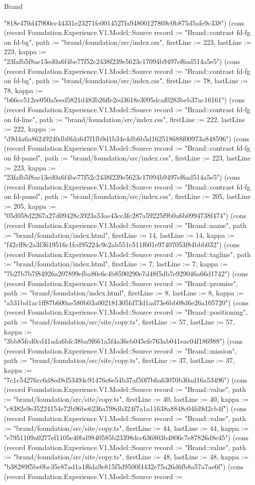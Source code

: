 \begin{lexlean}{Brand}
\begin{semanticmodule}
{"818e470d47900cc44331e23271fe0014527fa94800127869c0b875d5afe9c338"}) (cons (record Foundation.Experience.V1.Model::Source {record := "Brand::contrast fd-fg on fd-bg", path := "brand/foundation/src/index.css", firstLine := 223, lastLine := 223, kappa := "23fafb5f8ae13ed0a6f4be77f52c2438f239e5623c17094b9497ef6ad514a5e5"}) (cons (record Foundation.Experience.V1.Model::Source {record := "Brand::contrast fd-fg on fd-bg", path := "brand/foundation/src/index.css", firstLine := 78, lastLine := 78, kappa := "b66cc512ee050a5eed5821d483b26ffe2ed3618e3095dcaf0283beb37ac16161"}) (cons (record Foundation.Experience.V1.Model::Source {record := "Brand::contrast fd-fg on fd-line", path := "brand/foundation/src/index.css", firstLine := 222, lastLine := 222, kappa := "d9d4a6a86249240db0fda647f1fb9d1b34e4db6b5d162518688f00973a848596"}) (cons (record Foundation.Experience.V1.Model::Source {record := "Brand::contrast fd-fg on fd-panel", path := "brand/foundation/src/index.css", firstLine := 223, lastLine := 223, kappa := "23fafb5f8ae13ed0a6f4be77f52c2438f239e5623c17094b9497ef6ad514a5e5"}) (cons (record Foundation.Experience.V1.Model::Source {record := "Brand::contrast fd-fg on fd-panel", path := "brand/foundation/src/index.css", firstLine := 205, lastLine := 205, kappa := "05d058d2267a27d09428c3923a53ae43cc3fc287a59225f9b0a6b0994738f474"}) (cons (record Foundation.Experience.V1.Model::Source {record := "Brand::name", path := "brand/foundation/index.html", firstLine := 14, lastLine := 14, kappa := "f42cff8c2a3f3619516c1fcd95224c9c2ab551c511f601e97407053f84bbb032"}) (cons (record Foundation.Experience.V1.Model::Source {record := "Brand::tagline", path := "brand/foundation/index.html", firstLine := 7, lastLine := 7, kappa := "7b27b7b7f84926a207899efba80c6c4b8590290e7d48f5db7e929046a66d1742"}) (cons (record Foundation.Experience.V1.Model::Source {record := "Brand::promise", path := "brand/foundation/index.html", firstLine := 8, lastLine := 8, kappa := "a531bd1ac1ff87b600ae580b03a002181305fd73d1ad73e6bb08d6e26a105720"}) (cons (record Foundation.Experience.V1.Model::Source {record := "Brand::positioning", path := "brand/foundation/src/site/copy.ts", firstLine := 57, lastLine := 57, kappa := "3bb85fcd0cd41ada6bfc38ba9f661a5f4a36eb045efe763ab041eac04f186988"}) (cons (record Foundation.Experience.V1.Model::Source {record := "Brand::mission", path := "brand/foundation/src/site/copy.ts", firstLine := 37, lastLine := 37, kappa := "7c1c54276cc6d8ed8d53494c91476c6e54b37af50f7b6a63070b30ad16a53496"}) (cons (record Foundation.Experience.V1.Model::Source {record := "Brand::value", path := "brand/foundation/src/site/copy.ts", firstLine := 40, lastLine := 40, kappa := "c8382e9e35224154e72b96be6236a798db324f7a1a11638a8848c04fd9d2cb4f"}) (cons (record Foundation.Experience.V1.Model::Source {record := "Brand::value", path := "brand/foundation/src/site/copy.ts", firstLine := 44, lastLine := 44, kappa := "e7951109a0277ef1105e40bd9840585b23398dcc636803b4806c7e87826d8e45"}) (cons (record Foundation.Experience.V1.Model::Source {record := "Brand::value", path := "brand/foundation/src/site/copy.ts", firstLine := 48, lastLine := 48, kappa := "b38289f5be0bc35e87ad1a1f6da9e815f5d9500f4432e75a26d6fb8a57a7ae6f"}) (cons (record Foundation.Experience.V1.Model::Source {record := }
\end{semanticmodule}
\end{lexlean}

